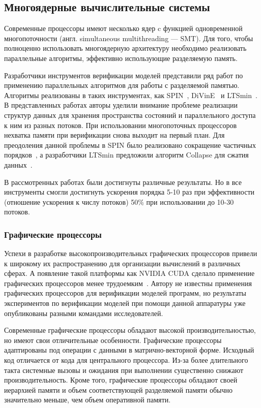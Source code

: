 \subsection{Многоядерные вычислительные системы}
Современные процессоры имеют несколько ядер c функцией одновременной многопоточности (англ. simultaneous multithreading — SMT).
Для того, чтобы полноценно использовать многоядерную архитектуру необходимо реализовать параллельные алгоритмы, эффективно использующие разделяемую память.

Разработчики инструментов верификации моделей представили ряд работ по применению параллельных алгоритмов для работы с разделяемой памятью. 
Алгоритмы реализованы в таких инструментах, как SPIN~\cite{Holzmann:2003:SMC,5661793,Holzmann:2012:PSM}, DiVinE~\cite{Brim2001,BARNAT2003,Brim2004,Brim:2006:OVD,Barnat:2010:SSM} и LTSmin~\cite{Laarman2011,Laarman:2010:BMR}.
В представленных работах авторы уделили внимание проблеме реализации структур данных для хранения пространства состояний и параллельного доступа к ним из разных потоков.
При использовании многопоточных процессоров нехватка памяти при верификации снова выходит на первый план.
Для преодоления данной проблемы в SPIN было реализовано сокращение частичных порядков~\cite{Bosnacki2006}, а разработчики LTSmin предложили алгоритм Collapse для сжатия данных~\cite{Laarman2011mem}.

В рассмотренных работах были достигнуты различные результаты.
Но в все инструменты смогли достигнуть ускорения порядка 5-10 раз при эффективности (отношение ускорения к числу потоков) 50\% при использовании до 10-30 потоков.

\subsubsection{Графические процессоры}
Успехи в разработке высокопроизводительных графических процессоров привели к широкому их распространению для организации вычислений в различных сферах.
А появление такой платформы как NVIDIA CUDA сделало применение графических процессоров менее трудоемким~\cite{cuda}.
Автору не известны применения графических процессоров для верификации моделей программ, но результаты экспериментов по верификации моделей при помощи данной аппаратуры уже опубликованы разными командами исследователей.

Современные графические процессоры обладают высокой производительностью, но имеют свои отличительные особенности.
Графические процессоры адаптированы под операции с данными в матрично-векторной форме.
Исходный код отличается от кода для центрального процессора.
Из-за более длительного такта системные вызовы и ожидания при выполнении существенно снижают производительность.
Кроме того, графические процессоры обладают своей иерархией памяти и объем соответствующей разделяемой памяти обычно значительно меньше, чем объем оперативной памяти.

